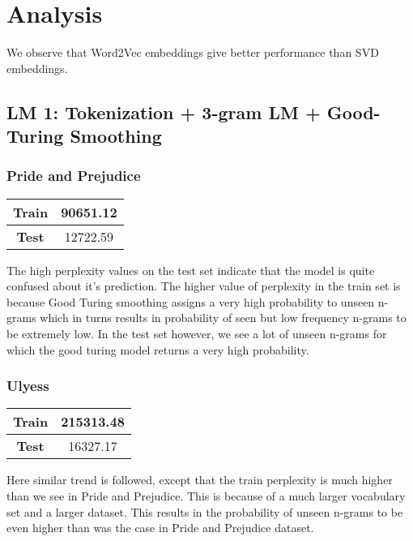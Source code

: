 \documentclass[a4paper,9pt]{report}
\begin{document}
\section*{Analysis}
We observe that Word2Vec embeddings give better performance than SVD embeddings.
 
\subsection*{LM 1: Tokenization + 3-gram LM + Good-Turing Smoothing}
\subsubsection*{Pride and Prejudice}
\begin{table}[H]
    \centering
    \begin{tabular}{|c|c|}
        \hline
        \textbf{Train} & {90651.12} \\
        \hline
        \textbf{Test} & {12722.59} \\
        \hline
    \end{tabular}
\end{table}
The high perplexity values on the test set indicate that the model is quite confused about it's prediction. The higher value of perplexity in the train set is because Good Turing smoothing assigns a very high probability to unseen n-grams which in turns results in probability of seen but low frequency n-grams to be extremely low. 
In the test set however, we see a lot of unseen n-grams for which the good turing model returns a very high probability.

\subsubsection*{Ulyess}
\begin{table}[H]
    \centering
    \begin{tabular}{|c|c|}
        \hline
        \textbf{Train} & {215313.48} \\
        \hline
        \textbf{Test} & {16327.17} \\
        \hline
    \end{tabular}
\end{table}
Here similar trend is followed, except that the train perplexity is much higher than we see in Pride and Prejudice. This is because of a much larger vocabulary set and a larger dataset. This results in the probability of unseen n-grams to be even higher than was the case in Pride and Prejudice dataset.
\end{document}
